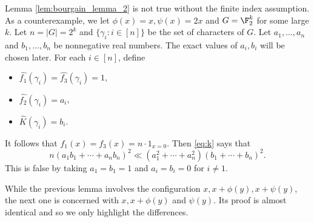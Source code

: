 \begin{remark} Lemma \ref{lem:bourgain_lemma_2} is not true without the finite index assumption.
As a counterexample, we let $\phi(x) = x, \psi(x) = 2x$ and $G=\F_2 ^k$ for some large $k$. Let $n=|G| = 2^k$ and $\{\gamma_i: i \in [n]\}$ be the set of characters of $G$. Let $a_1, \ldots, a_n$ and $b_1, \ldots, b_n$ be nonnegative real numbers. The exact values of $a_i, b_i$ will be chosen later. For each $i \in [n]$, define 
\begin{itemize}
\item $\widehat{f_1}(\gamma_i) = \widehat{f_3}(\gamma_i) =1$,
\item $\widehat{f_2}(\gamma_i) = a_i$,
\item $\widehat{K}(\gamma_i) = b_i$.
\end{itemize}
It follows that $f_1(x) = f_3(x) = n \cdot 1_{x=0}$.
Then \eqref{eq:k} says that
\[
n(a_1 b_1 + \cdots + a_n b_n)^2 \ll (a_1^2 + \cdots + a_n^2) (b_1 + \cdots + b_n)^2.
\]
This is false by taking $a_1=b_1=1$ and $a_i = b_i =0$ for $i \neq 1$.
\end{remark}

While the previous lemma involves the configuration $x, x + \phi(y), x + \psi(y)$, the next one is concerned with $x, x + \phi(y)$ and $\psi(y)$. Its proof is almost identical and so we only highlight the differences. 

